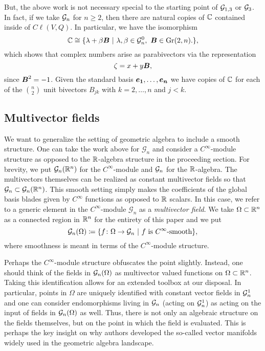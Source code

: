 But, the above work is not necessary special to the starting point of $\mathcal{G}_{1,3}$ or $\mathcal{G}_3$. In fact, if we take $\mathcal{G}_n$ for $n\geq 2$, then there are natural copies of $\mathbb{C}$ contained inside of $C\ell(V,Q)$. In particular, we have the isomorphism
\begin{equation}
    \mathbb{C} \cong \{\lambda + \beta \boldsymbol{B} ~\vert~ \lambda,\beta \in \mathcal{G}_n^0,~ \boldsymbol{B} \in \operatorname{Gr}(2,n). \},
\end{equation}
which shows that complex numbers arise as parabivectors via the representation
\begin{equation}
        \zeta = x + y\boldsymbol{B},
\end{equation}
since $\boldsymbol{B}^2=-1$. Given the standard basis $\boldsymbol{e_1},\dots,\boldsymbol{e_n}$ we have copies of $\mathbb{C}$ for each of the ${ n \choose 2}$ unit bivectors $B_{jk}$ with $k=2,\dots,n$ and $j<k$.





\subsection{Multivector fields}

We want to generalize the setting of geometric algebra to include a smooth structure. One can take the work above for $\mathcal{G}_n$ and consider a $C^{\infty}$-module structure as opposed to the $\mathbb{R}$-algebra structure in the proceeding section. For brevity, we put $\mathcal{G}_n(\mathbb{R}^n)$ for the $C^\infty$-module and $\mathcal{G}_n$ for the $\mathbb{R}$-algebra. The multivectors themselves can be realized as constant multivector fields so that $\mathcal{G}_n \subset \mathcal{G}_n(\mathbb{R}^n)$. This smooth setting simply makes the coefficients of the global basis blades given by $C^\infty$ functions as opposed to $\mathbb{R}$ scalars.  In this case, we refer to a generic element in the $C^{\infty}$-module $\mathcal{G}_n$ as a \emph{multivector field}. We take $\Omega \subset \mathbb{R}^n$ as a connected region in $\mathbb{R}^n$ for the entirety of this paper and we put
\[
\mathcal{G}_n(\Omega) \coloneqq \{ f \colon \Omega \to \mathcal{G}_n ~\vert~ \textrm{$f$ is $C^\infty$-smooth}\},
\]
where smoothness is meant in terms of the $C^\infty$-module structure.

Perhaps the $C^\infty$-module structure obfuscates the point slightly.  Instead, one should think of the fields in $\mathcal{G}_n(\Omega)$ as multivector valued functions on $\Omega \subset \mathbb{R}^n$.  Taking this identification allows for an extended toolbox at our disposal.  In particular, points in $\Omega$ are uniquely identified with constant vector fields in $\mathcal{G}_n^1$ and one can consider endomorphisms living in $\mathcal{G}_n$ (acting on $\mathcal{G}_n^1$) as acting on the input of fields in $\mathcal{G}_n(\Omega)$ as well.  Thus, there is not only an algebraic structure on the fields themselves, but on the point in which the field is evaluated.  This is perhaps the key insight on why authors developed the so-called vector manifolds widely used in the geometric algebra landscape.

